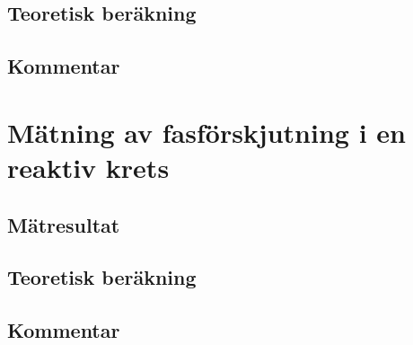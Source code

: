 \documentclass[11pt,a4paper]{article}
\begin{document}
\subsection{Teoretisk beräkning}\label{}

\subsection{Kommentar}\label{}


\section{Mätning av fasförskjutning i en reaktiv krets}\label{}

\subsection{Mätresultat}\label{}

\subsection{Teoretisk beräkning}\label{}

\subsection{Kommentar}\label{}


\end{document}
